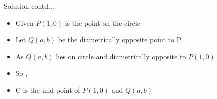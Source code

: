 \documentclass{beamer}
\begin{document}
\begin{frame}{Solution contd...}
\begin{itemize}
	\item {Given $P(1,0)$ is the point on the circle } \\
	    
	\item {Let $Q(a,b)$ be the diametrically opposite point to P}  \\ 
	\item{As $Q(a,b)$ lies on circle and diametrically opposite to $P(1,0)$}\\
	
	\item {So  ,} \\
	\item {C is the mid point of  $P(1,0)$ and $Q(a,b)$ }\\
	
\end{itemize}
\end{frame}
\end{document}
